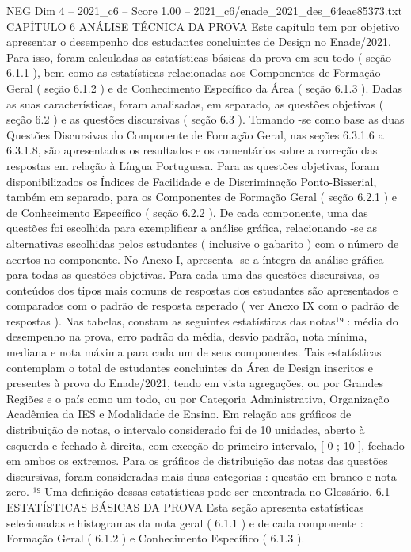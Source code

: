 \begin{textsample}{NEG Dim 4 – 2021\_c6 – Score 1.00 – 2021\_c6/enade\_2021\_des\_64eae85373.txt}  \label{ex:f4_neg_290}
CAPÍTULO 6 ANÁLISE TÉCNICA DA PROVA Este capítulo tem por objetivo apresentar o desempenho dos estudantes concluintes de Design no Enade/2021.
Para isso, foram calculadas as estatísticas básicas da prova em seu todo ( seção 6.1.1 ), bem como as estatísticas relacionadas aos Componentes de Formação Geral ( seção 6.1.2 ) e de Conhecimento Específico da Área ( seção 6.1.3 ).
Dadas as suas características, foram analisadas, em separado, as questões objetivas ( seção 6.2 ) e as questões discursivas ( seção 6.3 ).
Tomando -se como base as duas Questões Discursivas do Componente de Formação Geral, nas seções 6.3.1.6 a 6.3.1.8, são apresentados os resultados e os comentários sobre a correção das respostas em relação à Língua Portuguesa.
Para as questões objetivas, foram disponibilizados os Índices de Facilidade e de Discriminação Ponto-Bisserial, também em separado, para os Componentes de Formação Geral ( seção 6.2.1 ) e de Conhecimento Específico ( seção 6.2.2 ).
De cada componente, uma das questões foi escolhida para exemplificar a análise gráfica, relacionando -se as alternativas escolhidas pelos estudantes ( inclusive o gabarito ) com o número de acertos no componente.
No Anexo I, apresenta -se a íntegra da análise gráfica para todas as questões objetivas.
Para cada uma das questões discursivas, os conteúdos dos tipos mais comuns de respostas dos estudantes são apresentados e comparados com o padrão de resposta esperado ( ver Anexo IX com o padrão de respostas ).
Nas tabelas, constam as seguintes estatísticas das notas¹⁹ : média do desempenho na prova, erro padrão da média, desvio padrão, nota mínima, mediana e nota máxima para cada um de seus componentes.
Tais estatísticas contemplam o total de estudantes concluintes da Área de Design inscritos e presentes à prova do Enade/2021, tendo em vista agregações, ou por Grandes Regiões e o país como um todo, ou por Categoria Administrativa, Organização Acadêmica da IES e Modalidade de Ensino.
Em relação aos gráficos de distribuição de notas, o intervalo considerado foi de 10 unidades, aberto à esquerda e fechado à direita, com exceção do primeiro intervalo, [ 0 ; 10 ], fechado em ambos os extremos.
Para os gráficos de distribuição das notas das questões discursivas, foram consideradas mais duas categorias : questão em branco e nota zero. ¹⁹ Uma definição dessas estatísticas pode ser encontrada no Glossário. 6.1 ESTATÍSTICAS BÁSICAS DA PROVA Esta seção apresenta estatísticas selecionadas e histogramas da nota geral ( 6.1.1 ) e de cada componente : Formação Geral ( 6.1.2 ) e Conhecimento Específico ( 6.1.3 ).

\end{textsample}
